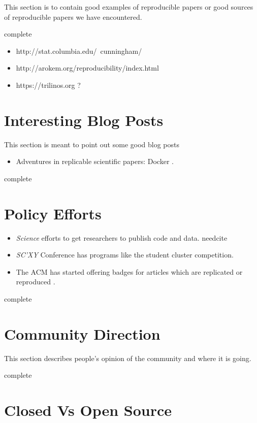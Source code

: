 \documentclass{article}
\newcommand{\complete}{
	\gls{complete}
}
\newcommand{\needcite}{
	\gls{needcite}
}
\begin{document}
This section is to contain good examples of reproducible papers or good sources of reproducible papers we have encountered.

\complete

\begin{itemize}
\item http://stat.columbia.edu/~cunningham/
\item http://arokem.org/reproducibility/index.html
\item https://trilinos.org ?
\end{itemize}

\section{Interesting Blog Posts}

This section is meant to point out some good blog posts

\begin{itemize}
\item Adventures in replicable scientific papers: Docker \cite{titus-brown-docker}.
\end{itemize}

\complete

\section{Policy Efforts}

\begin{itemize}
\item \textit{Science} efforts to get researchers to publish code and data. \needcite
\item \textit{SC'XY} Conference has programs like the student cluster competition. \cite{sighpc-connect-repro-1,sighpc-connect-repro-2}
\item The ACM has started offering badges for articles which are replicated or reproduced \cite{acm-badging-announcement}.
\end{itemize}

\complete

\section{Community Direction}

This section describes people's opinion of the community and where it is going.

\complete

\section{Closed Vs Open Source}
\end{document}
